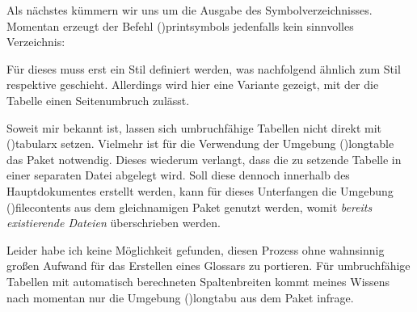 \documentclass[%
  english,ngerman,%
  cdgeometry=no,DIV=12,%
  cd=false,cdfont=false,cdtitle=true,%
  headings=normal,%
  automark,%
  listof=toc,%
]{tudscrartcl}
\begin{document}
%
Als nächstes kümmern wir uns um die Ausgabe des Symbolverzeichnisses. Momentan 
erzeugt der Befehl \Macro(){printsymbols} jedenfalls kein 
sinnvolles Verzeichnis:
%
\begin{Hint}
\printsymbols
\end{Hint}
\begin{quoting}[rightmargin=0pt]
\glsdisablehyper
\printsymbols[style=simple]
\end{quoting}
%
Für dieses muss erst ein Stil definiert werden, was nachfolgend ähnlich zum 
Stil  respektive  geschieht. Allerdings 
wird hier eine Variante gezeigt, mit der die Tabelle einen Seitenumbruch 
zulässt.



Soweit mir bekannt ist, lassen sich umbruchfähige Tabellen nicht direkt mit 
\Environment(){tabularx} setzen. Vielmehr ist für die 
Verwendung der Umgebung \Environment(){longtable} das Paket 
 notwendig. Dieses wiederum verlangt, dass die zu setzende 
Tabelle in einer separaten Datei abgelegt wird. Soll diese dennoch innerhalb 
des Hauptdokumentes erstellt werden, kann für dieses Unterfangen die Umgebung 
\Environment(){filecontents} aus dem gleichnamigen Paket 
genutzt werden, womit \emph{bereits existierende Dateien} überschrieben werden.

Leider habe ich keine Möglichkeit gefunden, diesen Prozess ohne wahnsinnig 
großen Aufwand für das Erstellen eines Glossars zu portieren. Für umbruchfähige 
Tabellen mit automatisch berechneten Spaltenbreiten kommt meines Wissens nach 
momentan nur die Umgebung \Environment(){longtabu} aus dem Paket 
 infrage.


\end{document}
